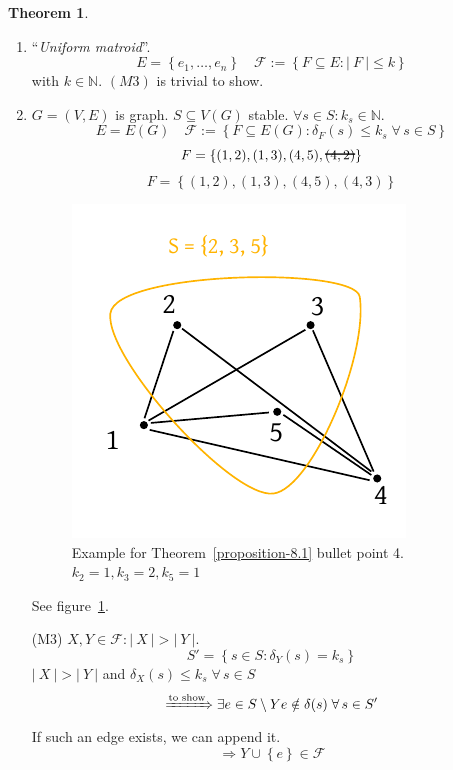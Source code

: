 \documentclass[a4paper]{article}
\theoremstyle{definition}
\newtheorem{theorem}{Theorem}
\newcommand{\card}[1]{\left|\:\!#1\:\!\right|}
\newcommand{\set}[1]{\left\{#1\right\}}
\newcommand{\fall}{\;\forall\,}
\newcommand\hcancel[2][black]{\setbox0=\hbox{$#2$}%
\rlap{\raisebox{.45\ht0}{\textcolor{#1}{\rule{\wd0}{1pt}}}}#2}
\begin{document}
\begin{theorem}
\begin{enumerate}
    \item ``\emph{Uniform matroid}''. 
      \[ E = \set{e_1, \ldots, e_n} \quad \mathcal{F} := \set{F \subseteq E: \card{F} \leq k} \]
      with $k \in \mathbb{N}$. $(M3)$ is trivial to show.

    \item $G = (V, E)$ is graph. $S \subseteq V(G)$ stable. $\forall s \in S: k_s \in \mathbb{N}$.
      \[ E = E(G) \quad \mathcal{F} := \set{F \subseteq E(G): \delta_F(s) \leq k_s \fall s \in S} \]
      \[ F = \set{(1, 2), (1, 3), (4, 5), \hcancel{(4, 2)}} \]
      \[ F = \set{(1, 2), (1, 3), (4, 5), (4, 3)} \]

      \begin{figure}[!ht]
        \begin{center}
          \includegraphics{img/matroid_example_for_4.pdf}
          \caption{Example for Theorem~\ref{proposition-8.1} bullet point 4. $k_2 = 1, k_3 = 2, k_5 = 1$}
          \label{fig:prop81-4-example}
        \end{center}
      \end{figure}

      See figure~\ref{fig:prop81-4-example}.

      (M3) $X, Y \in \mathcal{F}: \card{X} > \card{Y}$.
      \[
        S' = \set{s \in S: \delta_Y(s) = k_s}
      \]
      $\card{X} > \card{Y}$ and $\delta_X(s) \leq k_s \fall s \in S$
      \[
        \xRightarrow{\text{to show}}
          \exists e \in S \setminus Y
          e \notin \delta(s)
          \fall s \in S'
      \]
      If such an edge exists, we can append it.
      \[
        \Rightarrow Y \cup \set{e} \in \mathcal{F}
      \]


\end{enumerate}
\end{theorem}
\end{document}
